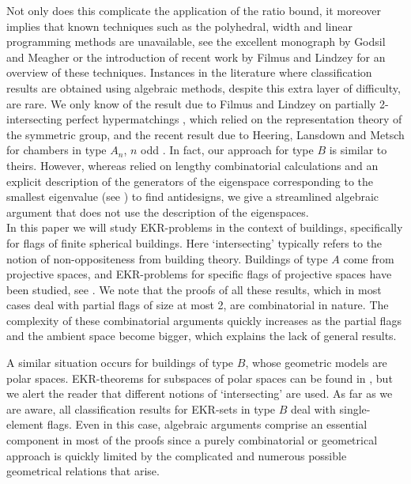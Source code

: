\documentclass[11pt]{article}
\begin{document}
Not only does this complicate the application of the ratio bound, it moreover implies that known techniques such as the polyhedral, width and linear programming methods are unavailable, see the excellent monograph by Godsil and Meagher \cite{GodsilMeagher} or the introduction of recent work by Filmus and Lindzey \cite{uniqueness_algebraically} for an overview of these techniques. Instances in the literature where classification results are obtained using algebraic methods, despite this extra layer of difficulty, are rare. We only know of the result due to Filmus and Lindzey on partially 2-intersecting perfect hypermatchings \cite[Section 9]{uniqueness_algebraically}, which relied on the representation theory of the symmetric group, and the recent result due to Heering, Lansdown and Metsch for chambers in type $A_n$, $n$ odd \cite{klaus_jesse_philipp}. In fact, our approach for type $B$ is similar to theirs. However, whereas \cite{klaus_jesse_philipp} relied on lengthy combinatorial calculations and an explicit description of the generators of the eigenspace corresponding to the smallest eigenvalue (see \cite{AlgebraicApproach2}) to find antidesigns, we give a streamlined algebraic argument that does not use the description of the eigenspaces.\\ 

In this paper we will study EKR-problems in the context of buildings, specifically for flags of finite spherical buildings. Here `intersecting' typically refers to the notion of non-oppositeness from building theory. Buildings of type $A$ come from projective spaces, and EKR-problems for specific flags of projective spaces have been studied, see \cite{line-plane-flags, point-hyperplane-flags, point-plane-flags, k-spaces_intersecting_k-2, heering_PG4q, heeringmetsch2023secondmax, plane-solid-flags}. We note that the proofs of all these results, which in most cases deal with partial flags of size at most 2, are combinatorial in nature. The complexity of these combinatorial arguments quickly increases as the partial flags and the ambient space become bigger, which explains the lack of general results. 

A similar situation occurs for buildings of type $B$, whose geometric models are polar spaces. EKR-theorems for subspaces of polar spaces can be found in \cite{boeck_ekr_polarspaces, ihringer_ekr_polarspaces, EKR_polarspace_smallsubspaces,metsch_pairwise-non-opp-lines, EKR_polarspace_generators}, but we alert the reader that different notions of `intersecting' are used. As far as we are aware, all classification results for EKR-sets in type $B$ deal with single-element flags.
Even in this case, algebraic arguments comprise an essential component in most of the proofs since a purely combinatorial or geometrical approach is quickly limited by 
the complicated and numerous possible geometrical relations that arise.
\end{document}
